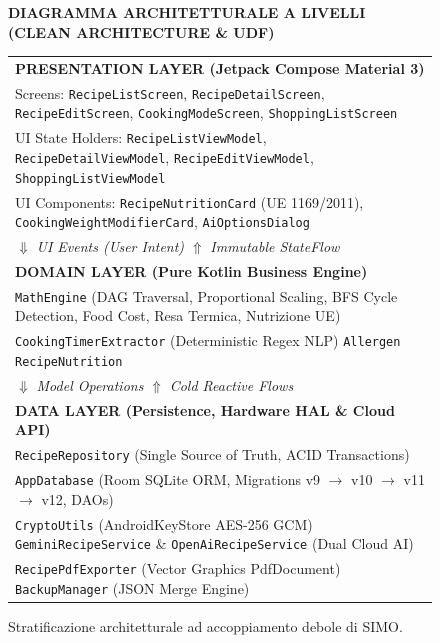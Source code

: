 \documentclass[11pt,a4paper,titlepage]{article}
\begin{document}
\begin{figure}[h!]
	\centering
	\begin{tcolorbox}[
		enhanced,
		colback=techLightBg,
		colframe=techNavy,
		arc=3mm,
		width=0.92\textwidth,
		boxrule=1pt,
		halign=center
		]
		\small
		\textbf{\color{techNavy}DIAGRAMMA ARCHITETTURALE A LIVELLI (CLEAN ARCHITECTURE \& UDF)}\\[0.3cm]
		
		\begin{tabularx}{\linewidth}{|>{\centering\arraybackslash}X|}
			\hline
			\textbf{\color{techBlue}PRESENTATION LAYER (Jetpack Compose Material 3)}\\
			Screens: \texttt{RecipeListScreen}, \texttt{RecipeDetailScreen}, \texttt{RecipeEditScreen}, \texttt{CookingModeScreen}, \texttt{ShoppingListScreen}\\
			UI State Holders: \texttt{RecipeListViewModel}, \texttt{RecipeDetailViewModel}, \texttt{RecipeEditViewModel}, \texttt{ShoppingListViewModel}\\
			UI Components: \texttt{RecipeNutritionCard} (UE 1169/2011), \texttt{CookingWeightModifierCard}, \texttt{AiOptionsDialog}\\
			\hline
			$\Downarrow$ \textit{UI Events (User Intent)} \quad $\Uparrow$ \textit{Immutable StateFlow}\\
			\hline
			\textbf{\color{techNavy}DOMAIN LAYER (Pure Kotlin Business Engine)}\\
			\texttt{MathEngine} (DAG Traversal, Proportional Scaling, BFS Cycle Detection, Food Cost, Resa Termica, Nutrizione UE)\\
			\texttt{CookingTimerExtractor} (Deterministic Regex NLP) \textbullet{} \texttt{Allergen} \textbullet{} \texttt{RecipeNutrition} \\
			\hline
			$\Downarrow$ \textit{Model Operations} \quad $\Uparrow$ \textit{Cold Reactive Flows}\\
			\hline
			\textbf{\color{techSlate}DATA LAYER (Persistence, Hardware HAL \& Cloud API)}\\
			\texttt{RecipeRepository} (Single Source of Truth, ACID Transactions)\\
			\texttt{AppDatabase} (Room SQLite ORM, Migrations v9 $\to$ v10 $\to$ v11 $\to$ v12, DAOs)\\
			\texttt{CryptoUtils} (AndroidKeyStore AES-256 GCM) \textbullet{} \texttt{GeminiRecipeService} \& \texttt{OpenAiRecipeService} (Dual Cloud AI)\\
			\texttt{RecipePdfExporter} (Vector Graphics PdfDocument) \textbullet{} \texttt{BackupManager} (JSON Merge Engine)\\
			\hline
		\end{tabularx}
	\end{tcolorbox}
	\caption{Stratificazione architetturale ad accoppiamento debole di SIMO.}
	\label{fig:arch_layers}
\end{figure}
\end{document}
